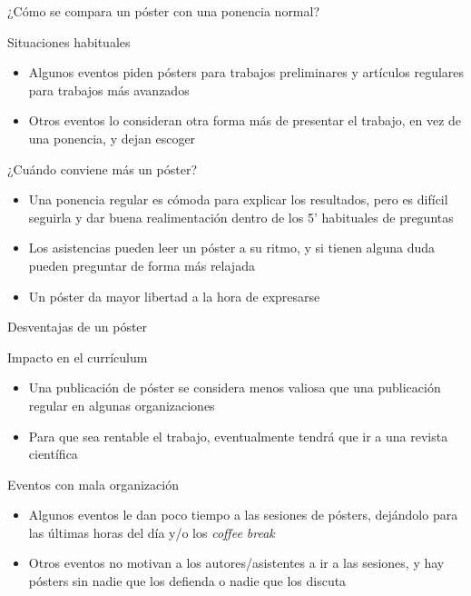 \documentclass[xcolor=svgnames,compress]{beamer}
\begin{document}
\begin{frame}{¿Cómo se compara un póster con una ponencia normal?}

  \begin{block}{Situaciones habituales}
    \begin{itemize}
    \item Algunos eventos piden pósters para trabajos preliminares y
      artículos regulares para trabajos más avanzados
    \item Otros eventos lo consideran otra forma más de presentar el
      trabajo, en vez de una ponencia, y dejan escoger
    \end{itemize}
  \end{block}

  \begin{block}{¿Cuándo conviene más un póster?}
    \begin{itemize}
    \item Una ponencia regular es cómoda para explicar los resultados,
      pero es difícil seguirla y dar buena realimentación dentro de
      los 5' habituales de preguntas
    \item Los asistencias pueden leer un póster a su ritmo, y si
      tienen alguna duda pueden preguntar de forma más relajada
    \item Un póster da mayor libertad a la hora de expresarse
    \end{itemize}
  \end{block}
  
\end{frame}

\begin{frame}{Desventajas de un póster}

  \begin{block}{Impacto en el currículum}
    \begin{itemize}
    \item Una publicación de póster se considera menos valiosa que una
      publicación regular en algunas organizaciones
    \item Para que sea rentable el trabajo, eventualmente tendrá que
      ir a una revista científica
    \end{itemize}
  \end{block}

  \begin{block}{Eventos con mala organización}
    \begin{itemize}
    \item Algunos eventos le dan poco tiempo a las sesiones de
      pósters, dejándolo para las últimas horas del día y/o los
      \emph{coffee break}
    \item Otros eventos no motivan a los autores/asistentes a ir a las
      sesiones, y hay pósters sin nadie que los defienda o nadie que
      los discuta
    \end{itemize}
  \end{block}

\end{frame}
\end{document}
